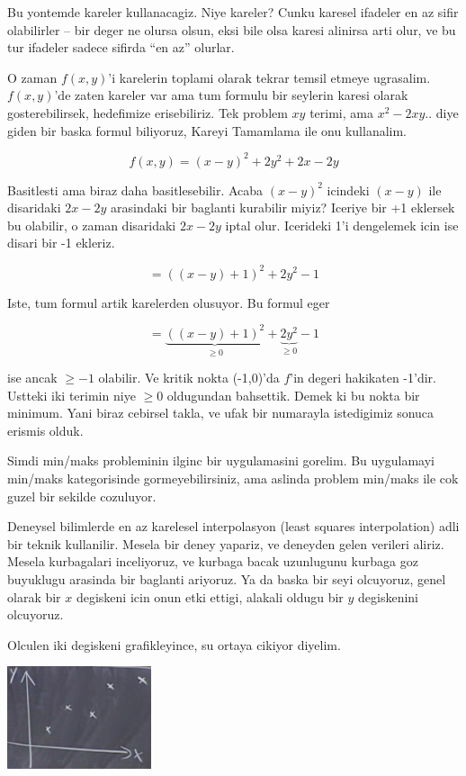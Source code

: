 \documentclass[12pt,fleqn]{article}
\begin{document}
Bu yontemde kareler kullanacagiz. Niye kareler? Cunku karesel ifadeler en
az sifir olabilirler -- bir deger ne olursa olsun, eksi bile olsa karesi
alinirsa arti olur, ve bu tur ifadeler sadece sifirda ``en az'' olurlar.

O zaman $f(x,y)$'i karelerin toplami olarak tekrar temsil etmeye
ugrasalim. $f(x,y)$'de zaten kareler var ama tum formulu bir seylerin
karesi olarak gosterebilirsek, hedefimize erisebiliriz. Tek problem $xy$
terimi, ama $x^2 - 2xy..$ diye giden bir baska formul biliyoruz, Kareyi
Tamamlama ile onu kullanalim.

\[ f(x,y) = (x-y)^2 + 2y^2 + 2x - 2y \]

Basitlesti ama biraz daha basitlesebilir. Acaba $(x-y)^2$ icindeki $(x-y)$
ile disaridaki $2x - 2y$ arasindaki bir baglanti kurabilir miyiz? Iceriye
bir +1 eklersek bu olabilir, o zaman disaridaki $2x - 2y$ iptal
olur. Icerideki 1'i dengelemek icin ise disari bir -1 ekleriz.

\[  = ((x-y) + 1)^2 + 2y^2 - 1\]

Iste, tum formul artik karelerden olusuyor. Bu formul eger 

\[  = \underbrace{((x-y) + 1)^2}_{\ge 0} + \underbrace{2y^2}_{\ge 0} - 1\]

ise ancak $\ge -1$ olabilir. Ve kritik nokta (-1,0)'da $f$'in degeri
hakikaten -1'dir. Ustteki iki terimin niye $\ge 0$ oldugundan
bahsettik. Demek ki bu nokta bir minimum.  Yani biraz cebirsel takla, ve
ufak bir numarayla istedigimiz sonuca erismis olduk.

Simdi min/maks probleminin ilginc bir uygulamasini gorelim. Bu uygulamayi
min/maks kategorisinde gormeyebilirsiniz, ama aslinda problem min/maks ile
cok guzel bir sekilde cozuluyor.

Deneysel bilimlerde en az karelesel interpolasyon (least squares
interpolation) adli bir teknik kullanilir. Mesela bir deney yapariz, ve
deneyden gelen verileri aliriz. Mesela kurbagalari inceliyoruz, ve kurbaga
bacak uzunlugunu kurbaga goz buyuklugu arasinda bir baglanti ariyoruz. Ya
da baska bir seyi olcuyoruz, genel olarak bir $x$ degiskeni icin onun etki
ettigi, alakali oldugu bir $y$ degiskenini olcuyoruz.

Olculen iki degiskeni grafikleyince, su ortaya cikiyor diyelim.

\includegraphics[height=3cm]{9_5.png}
\end{document}
